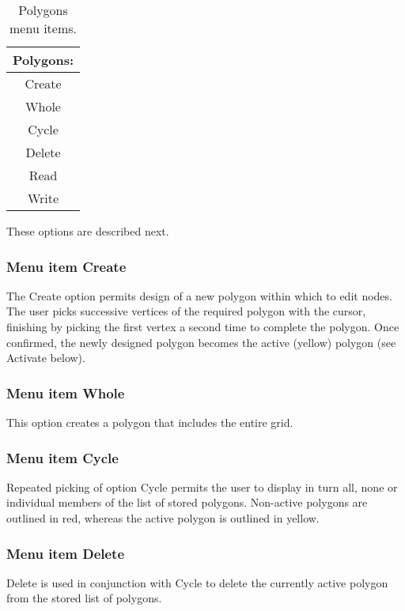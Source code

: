 \documentclass{article}
\begin{document}
\begin{table}[htb!]
 \caption{Polygons menu items.}
  \begin{center}
   \begin{tabular}{|c|}
    \hline
Polygons:\\     \hline
Create \\ Whole \\ Cycle \\ Delete \\ Read \\ Write \\
    \hline
   \end{tabular}
   \label{tab:POLYGONS}
  \end{center}
\end{table}


These options are described next.

\subsubsection[Menu item Create]{Menu item Create}
The Create option permits design of a new polygon within which to edit nodes. The user picks successive vertices of the required polygon with the cursor, finishing by picking the first vertex a second time to complete the polygon. Once confirmed, the newly designed polygon becomes the active (yellow) polygon (see Activate below).

\subsubsection[Menu item Whole]{Menu item Whole}
This option creates a polygon that includes the entire grid.

\subsubsection[Menu item Cycle]{Menu item Cycle}
Repeated picking of option Cycle permits the user to display in turn all, none or individual members of the list of stored polygons. Non-active polygons are outlined in red, whereas the active polygon is outlined in yellow.

\subsubsection[Menu item Delete]{Menu item Delete}
Delete is used in conjunction with Cycle to delete the currently active polygon from the stored list of polygons.
\end{document}
